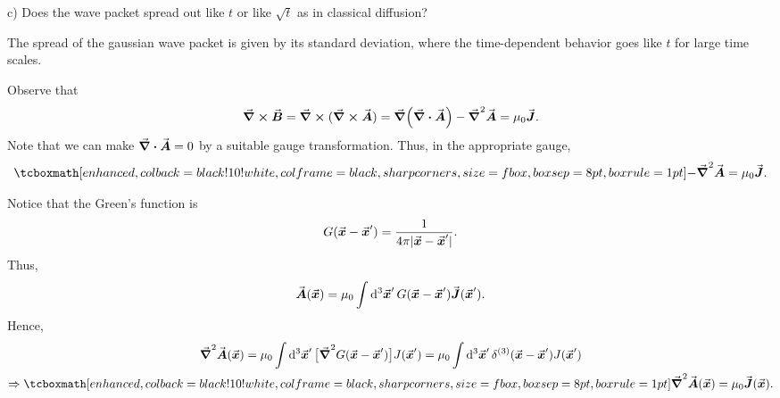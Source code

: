 c) Does the wave packet spread out like $t$ or like $\sqrt{t}$ as in classical diffusion?

The spread of the gaussian wave packet is given by its standard deviation, where the time-dependent behavior goes like $t$ for large time scales.


Observe that
\begin{eqnarray}
    \label{eq:Lap-for-A}
    \grad \cross \va*{B} = \grad \cross (\grad \cross \va*{A}) = \grad(\grad \vdot \va*{A}) - \grad^2\va*{A} = \mu_0 \va*{J}
.\end{eqnarray}
Note that we can make $\grad \vdot \va*{A} = 0$ by a suitable gauge transformation.
Thus, in the appropriate gauge,
\begin{eqnarray}
    \label{eq:Lap-for-A-1}
    \eqbox{
    -\grad^2 \va*{A} = \mu_0 \va*{J}
    } 
.\end{eqnarray}



Notice that the Green's function is 
\begin{eqnarray}
    \label{eq:greens-simplified}
    G(\va*{x} - \va*{x}') = \frac{1}{4\pi |\va*{x} - \va*{x}'|} 
.\end{eqnarray}
Thus,
\begin{eqnarray}
    \label{eq:Avec-int}
    \va*{A}(\va*{x}) = \mu_0 \int \dd[3]{\va*{x}'} G(\va*{x} - \va*{x}')\va*{J}(\va*{x}')
.\end{eqnarray}
Hence,
\begin{gather}
    \label{eq:lap-Avec}
    \grad^2 \va*{A}(\va*{x}) = \mu_0 \int \dd[3]{\va*{x}'} \big[ \grad^2 G(\va*{x}-\va*{x}') \big] J(\va*{x}') = \mu_0 \int \dd[3]{\va*{x}'} \delta^{(3)}(\va*{x} - \va*{x}') J(\va*{x}') \\
    \Rightarrow \eqbox{\grad^2 \va*{A}(\va*{x}) = \mu_0 \va*{J}(\va*{x})}
.\end{gather}


